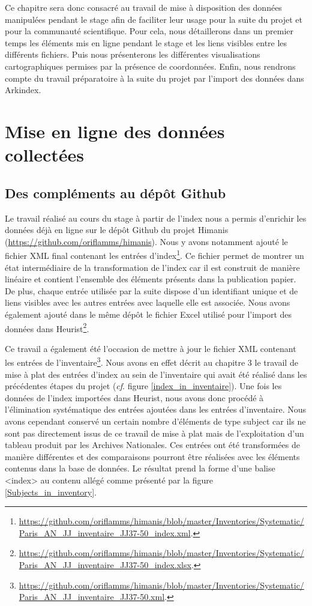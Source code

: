 \documentclass[a4paper,12pt,twoside]{book}
\begin{document}
	Ce chapitre sera donc consacré au travail de mise à disposition des données manipulées pendant le stage afin de faciliter leur usage pour la suite du projet et pour la communauté scientifique. Pour cela, nous détaillerons dans un premier temps les éléments mis en ligne pendant le stage et les liens visibles entre les différents fichiers. Puis nous présenterons les différentes visualisations cartographiques permises par la présence de coordonnées. Enfin, nous rendrons compte du travail préparatoire à la suite du projet par l'import des données dans Arkindex.
	
	\section{Mise en ligne des données collectées}
	
	\subsection{Des compléments au dépôt Github}
	
	Le travail réalisé au cours du stage à partir de l'index nous a permis d'enrichir les données déjà en ligne sur le dépôt Github du projet Himanis (\url{https://github.com/oriflamms/himanis}). Nous y avons notamment ajouté le fichier XML final contenant les entrées d'index\footnote{\url{https://github.com/oriflamms/himanis/blob/master/Inventories/Systematic/Paris_AN_JJ_inventaire_JJ37-50_index.xml}.}. Ce fichier permet de montrer un état intermédiaire de la transformation de l'index car il est construit de manière linéaire et contient l'ensemble des éléments présents dans la publication papier. De plus, chaque entrée utilisée par la suite dispose d'un identifiant unique et de liens visibles avec les autres entrées avec laquelle elle est associée. Nous avons également ajouté dans le même dépôt le fichier Excel utilisé pour l'import des données dans Heurist\footnote{\url{https://github.com/oriflamms/himanis/blob/master/Inventories/Systematic/Paris_AN_JJ_inventaire_JJ37-50_index.xlsx}.}.
	
	Ce travail a également été l'occasion de mettre à jour le fichier XML contenant les entrées de l'inventaire\footnote{\url{https://github.com/oriflamms/himanis/blob/master/Inventories/Systematic/Paris_AN_JJ_inventaire_JJ37-50.xml}.}. Nous avons en effet décrit au chapitre 3 le travail de mise à plat des entrées d'index au sein de l'inventaire qui avait été réalisé dans les précédentes étapes du projet (\textit{cf}. figure \ref{index_in_inventaire}). Une fois les données de l'index importées dans Heurist, nous avons donc procédé à l'élimination systématique des entrées ajoutées dans les entrées d'inventaire. Nous avons cependant conservé un certain nombre d'éléments de type \og subject \fg{} car ils ne sont pas directement issus de ce travail de mise à plat mais de l'exploitation d'un tableau produit par les Archives Nationales. Ces entrées ont été transformées de manière différentes et des comparaisons pourront être réalisées avec les éléments contenus dans la base de données. Le résultat prend la forme d'une balise <index> au contenu allégé comme présenté par la figure \ref{Subjects_in_inventory}.
	
\end{document}
